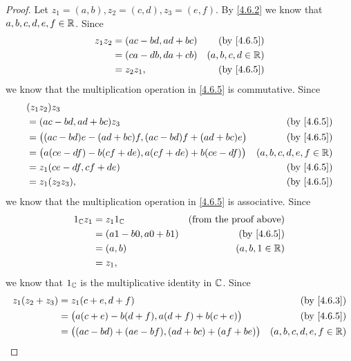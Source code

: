 \begin{proof}
  Let \(z_1 = (a, b), z_2 = (c, d), z_3 = (e, f)\).
  By \cref{4.6.2} we know that \(a, b, c, d, e, f \in \mathbb{R}\).
  Since
  \begin{align*}
    z_1 z_2 & = (ac - bd, ad + bc) & \text{(by \cref{4.6.5})} \\
            & = (ca - db, da + cb) & (a, b, c, d \in \R)      \\
            & = z_2 z_1,           & \text{(by \cref{4.6.5})}
  \end{align*}
  we know that the multiplication operation in \cref{4.6.5} is commutative.
  Since
  \begin{align*}
     & (z_1 z_2) z_3                                                                                \\
     & = (ac - bd, ad + bc) z_3                                         & \text{(by \cref{4.6.5})}  \\
     & = \big((ac - bd) e - (ad + bc) f, (ac - bd) f + (ad + bc) e\big) & \text{(by \cref{4.6.5})}  \\
     & = \big(a (ce - df) - b (cf + de), a (cf + de) + b (ce - df)\big) & (a, b, c, d, e, f \in \R) \\
     & = z_1 (ce - df, cf + de)                                         & \text{(by \cref{4.6.5})}  \\
     & = z_1 (z_2 z_3),                                                 & \text{(by \cref{4.6.5})}
  \end{align*}
  we know that the multiplication operation in \cref{4.6.5} is associative.
  Since
  \begin{align*}
    1_{\C} z_1 & = z_1 1_{\C}             & \text{(from the proof above)} \\
               & = (a 1 - b 0, a 0 + b 1) & \text{(by \cref{4.6.5})}      \\
               & = (a, b)                 & (a, b, 1 \in \R)              \\
               & = z_1,
  \end{align*}
  we know that \(1_{\mathbb{C}}\) is the multiplicative identity in \(\mathbb{C}\).
  Since
  \begin{align*}
    z_1 (z_2 + z_3) & = z_1 (c + e, d + f)                                      & \text{(by \cref{4.6.3})}  \\
                    & = \big(a (c + e) - b (d + f), a (d + f) + b (c + e)\big)  & \text{(by \cref{4.6.5})}  \\
                    & = \big((ac - bd) + (ae - bf), (ad + bc) + (af + be) \big) & (a, b, c, d, e, f \in \R) \\

\end{align*}
\end{proof}
